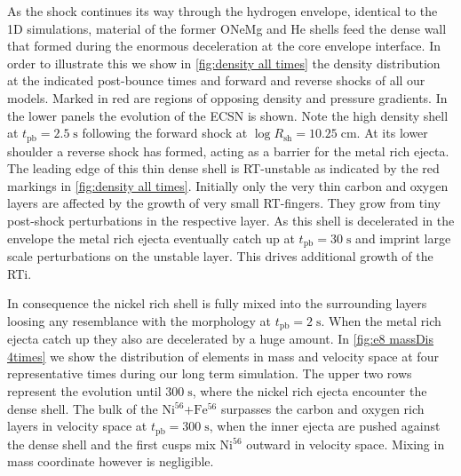 \documentclass[fleqn,usenatbib]{mnras}
\newcommand{\tpb}{\ensuremath{t_{\text{pb}}}}
\newcommand{\nickel}{$\mathrm{Ni^{56}}$\xspace}
\newcommand{\iron}{$\mathrm{Fe^{56}}$\xspace}
\renewcommand{\sec}{\xspace\ensuremath{\mathrm{s}}}
\begin{document}
As the shock continues its way through the hydrogen envelope, identical to the 1D simulations, material of the former ONeMg and He shells feed the dense wall that formed during the enormous deceleration at the core envelope interface. In order to illustrate this we show in \autoref{fig:density all times} the density distribution at the indicated post-bounce times and forward and reverse shocks of all our models. Marked in red are regions of opposing density and pressure gradients.
In the lower panels the evolution of the ECSN is shown. Note the high density shell at $\tpb=2.5\;\sec$ following the forward shock at $\log{R_{\mathrm{sh}}}=10.25\;\mathrm{cm}$. 
At its lower shoulder a reverse shock has formed, acting as a barrier for the metal rich ejecta. The leading edge of this thin dense shell is RT-unstable as indicated by the red markings in \autoref{fig:density all times}. Initially only the very thin carbon and oxygen layers are affected by the growth of very small RT-fingers. They grow from tiny post-shock perturbations in the respective layer. As this shell is decelerated in the envelope the metal rich ejecta eventually catch up at $\tpb=30\;\sec$ and imprint large scale perturbations on the unstable layer. This drives additional growth of the RTi.

In consequence the nickel rich shell is fully mixed into the surrounding layers loosing any resemblance with the morphology at $\tpb=2\;\sec$. 
When the metal rich ejecta catch up they also are decelerated by a huge amount.
In \autoref{fig:e8 massDis 4times} we show the distribution of elements in mass and velocity space at four representative times during our long term simulation. The upper two rows represent the evolution until $300\;\mathrm{s}$, where the nickel rich ejecta encounter the dense shell.
The bulk of the \nickel+\iron surpasses the carbon and oxygen rich layers in velocity space at $t_{\mathrm{pb}}=300\;\mathrm{s}$, when the inner ejecta are pushed against the dense shell and the first cusps mix \nickel outward in velocity space. Mixing in mass coordinate however is negligible.
\end{document}
